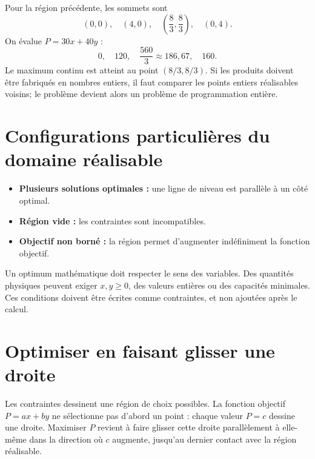 \documentclass[12pt,a4paper,openany]{book}
\begin{document}
\begin{examplebox}
Pour la région précédente, les sommets sont
\[
(0,0),\quad(4,0),\quad\left(\frac83,\frac83\right),\quad(0,4).
\]
On évalue $P=30x+40y$ :
\[
0,\quad120,\quad\frac{560}{3}\approx186{,}67,\quad160.
\]
Le maximum continu est atteint au point $(8/3,8/3)$. Si les produits doivent être fabriqués en nombres entiers, il faut comparer les points entiers réalisables voisins; le problème devient alors un problème de programmation entière.
\end{examplebox}

\section{Configurations particulières du domaine réalisable}

\begin{itemize}
\item \textbf{Plusieurs solutions optimales :} une ligne de niveau est parallèle à un côté optimal.
\item \textbf{Région vide :} les contraintes sont incompatibles.
\item \textbf{Objectif non borné :} la région permet d'augmenter indéfiniment la fonction objectif.
\end{itemize}

\begin{warningbox}
Un optimum mathématique doit respecter le sens des variables. Des quantités physiques peuvent exiger $x,y\ge0$, des valeurs entières ou des capacités minimales. Ces conditions doivent être écrites comme contraintes, et non ajoutées après le calcul.
\end{warningbox}


\section{Optimiser en faisant glisser une droite}

\begin{visualbox}
Les contraintes dessinent une région de choix possibles. La fonction objectif $P=ax+by$ ne sélectionne pas d'abord un point : chaque valeur $P=c$ dessine une droite. Maximiser $P$ revient à faire glisser cette droite parallèlement à elle-même dans la direction où $c$ augmente, jusqu'au dernier contact avec la région réalisable.
\end{visualbox}
\end{document}
